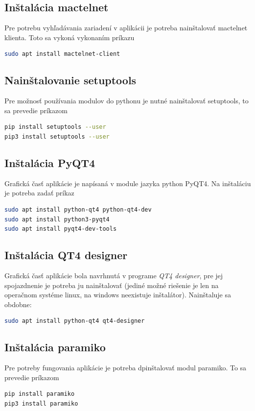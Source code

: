 \subsection{Inštalácia mactelnet}
Pre potrebu vyhľadávania zariadení v aplikácii je potreba nainštalovať mactelnet klienta. Toto sa vykoná vykonaním príkazu
\begin{lstlisting}[language=bash, frame=single, caption=Nainštalovanie mactelnet,captionpos=b, showstringspaces=false, basicstyle=\footnotesize]
sudo apt install mactelnet-client
\end{lstlisting}
\subsection{Nainštalovanie setuptools}
Pre možnosť používania modulov do pythonu je nutné nainštalovať setuptools, to sa prevedie príkazom
\begin{lstlisting}[language=bash, frame=single, caption=Nainštalovanie setuptools,captionpos=b, showstringspaces=false, basicstyle=\footnotesize]
pip install setuptools --user
pip3 install setuptools --user
\end{lstlisting}
\subsection{Inštalácia PyQT4}
Grafická časť aplikácie je napísaná v module jazyka python PyQT4. Na inštaláciu je potreba zadať príkaz
\begin{lstlisting}[language=bash, frame=single, caption=Nainštalovanie pyqt4,captionpos=b, showstringspaces=false, basicstyle=\footnotesize]
sudo apt install python-qt4 python-qt4-dev
sudo apt install python3-pyqt4
sudo apt install pyqt4-dev-tools
\end{lstlisting}
\subsection{Inštalácia QT4 designer}
Grafická časť aplikácie bola navrhnutá v programe \textit{QT4 designer}, pre jej spojazdnenie je potreba ju nainštalovať (jediné možné riešenie je len na operačnom systéme linux, na windows neexistuje inštalátor). Nainštaluje sa obdobne:
\begin{lstlisting}[language=bash, frame=single, caption=Nainštalovanie qt4 designera,captionpos=b, showstringspaces=false, basicstyle=\footnotesize]
sudo apt install python-qt4 qt4-designer
\end{lstlisting}
\subsection{Inštalácia paramiko}
Pre potreby fungovania aplikácie je potreba dpinštalovať modul paramiko. To sa prevedie príkazom
\begin{lstlisting}[language=bash, frame=single, caption=Inštalácia paramiko,captionpos=b, showstringspaces=false, basicstyle=\footnotesize]
pip install paramiko
pip3 install paramiko
\end{lstlisting}
